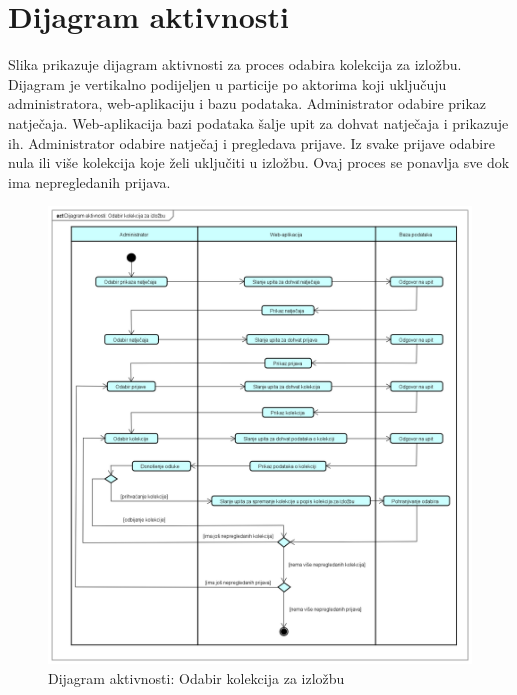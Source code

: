 {\begin{figure}[H]
			\end{figure}
			\eject 
		
		\section{Dijagram aktivnosti}
	
			{Slika prikazuje dijagram aktivnosti za proces odabira kolekcija za izložbu. Dijagram je vertikalno podijeljen u particije po aktorima koji uključuju administratora, web-aplikaciju i bazu podataka. Administrator odabire prikaz natječaja. Web-aplikacija bazi podataka šalje upit za dohvat natječaja i prikazuje ih. Administrator odabire natječaj i pregledava prijave. Iz svake prijave odabire nula ili više kolekcija koje želi uključiti u izložbu. Ovaj proces se ponavlja sve dok ima nepregledanih prijava.}
			
			\begin{figure}[H]
				
				\includegraphics[width=\textwidth,height=\textheight,keepaspectratio]{dijagram_aktivnosti}
				\caption{Dijagram aktivnosti: Odabir kolekcija za izložbu}
				
			\end{figure}
			\eject

}
